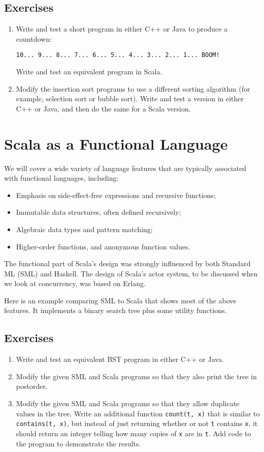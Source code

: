\documentclass[11pt]{article}
\begin{document}
\subsection*{Exercises}
\begin{enumerate}
  \item Write and test a short program in either C++ or Java to produce a
  countdown:
    \begin{Verbatim}
10... 9... 8... 7... 6... 5... 4... 3... 2... 1... BOOM!
    \end{Verbatim}
  Write and test an equivalent program in Scala.
  \item Modify the insertion sort programs to use a different sorting
  algorithm (for example, selection sort or bubble sort). Write and test a
  version in either C++ or Java, and then do the same for a Scala version.
\end{enumerate}

\section{Scala as a Functional Language}
We will cover a wide variety of language features that are typically
associated with functional languages, including:
\begin{itemize}
\item Emphasis on side-effect-free expressions and recursive functions;
\item Immutable data structures, often defined recursively;
\item Algebraic data types and pattern matching;
\item Higher-order functions, and anonymous function values.
\end{itemize}
The functional part of Scala's design was strongly influenced by
both Standard ML (SML) and Haskell. The design of Scala's actor
system, to be discussed when we look at concurrency, was based on
Erlang.

Here is an example comparing SML to Scala that shows most of the
above features. It implements a binary search tree plus some utility
functions.

\subsection*{Exercises}
\begin{enumerate}
  \item Write and test an equivalent BST program in either C++ or Java.
  \item Modify the given SML and Scala programs so that they also print
  the tree in postorder.
  \item Modify the given SML and Scala programs so that they allow
  duplicate values in the tree. Write an additional function \verb|count(t, x)|
  that is similar to \verb|contains(t, x)|, but instead of just returning
  whether or not \verb|t| contains \verb|x|, it should return an integer
  telling how many copies of \verb|x| are in \verb|t|. Add code to the
  program to demonstrate the results.
\end{enumerate}
\end{document}
